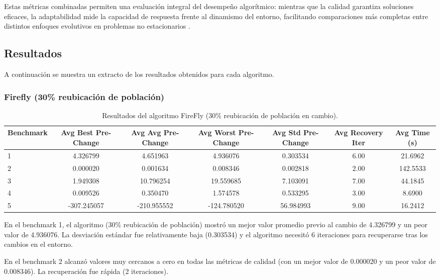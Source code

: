 \documentclass[10pt]{article}
\begin{document}
Estas métricas combinadas permiten una evaluación integral del desempeño algorítmico: mientras que la calidad garantiza soluciones eficaces, la adaptabilidad mide la capacidad de respuesta frente al dinamismo del entorno, facilitando comparaciones más completas entre distintos enfoques evolutivos en problemas no estacionarios \cite{morrison2003performance}.

\subsection*{Resultados}

A continuación se muestra un extracto de los resultados obtenidos para cada algoritmo. 

\subsubsection*{Firefly (30\% reubicación de población)}
\begin{table}[H]
\centering
\caption{Resultados del algoritmo FireFly (30\% reubicación de población en cambio).}
\label{tab:firefly}
\scriptsize
\begin{tabular}{lcccccc}
\toprule
\textbf{Benchmark} & \textbf{Avg Best Pre-Change} & \textbf{Avg Avg Pre-Change} & \textbf{Avg Worst Pre-Change} & \textbf{Avg Std Pre-Change} & \textbf{Avg Recovery Iter} & \textbf{Avg Time (s)} \\
\midrule
1 & 4.326799 & 4.651963 & 4.936076 & 0.303534 & 6.00 & 21.6962 \\
2 & 0.000020 & 0.001634 & 0.008346 & 0.002818 & 2.00 & 142.5533 \\
3 & 1.949308 & 10.796254 & 19.559685 & 7.103091 & 7.00 & 44.1845 \\
4 & 0.009526 & 0.350470 & 1.574578 & 0.533295 & 3.00 & 8.6900 \\
5 & -307.245057 & -210.955552 & -124.780520 & 56.984993 & 9.00 & 16.2412 \\
\bottomrule
\end{tabular}
\end{table}

En el benchmark 1, el algoritmo  (30\% reubicación de población) mostró un mejor valor promedio previo al cambio de 4.326799 y un peor valor de 4.936076. La desviación estándar fue relativamente baja (0.303534) y el algoritmo necesitó 6 iteraciones para recuperarse tras los cambios en el entorno.

En el benchmark 2 alcanzó valores muy cercanos a cero en todas las métricas de calidad (con un mejor valor de 0.000020 y un peor valor de 0.008346). La recuperación fue rápida (2 iteraciones).
\end{document}
